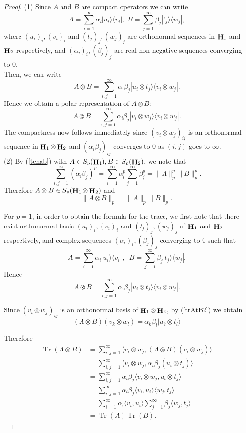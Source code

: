 \documentclass[a4paper,12pt,reqno]{amsart}
\renewcommand\eqref[1]{(\ref{#1})} %
\theoremstyle{definition}
\theoremstyle{remark}
\numberwithin{equation}{section}
\newcommand{\beq}{\begin{equation}}
\newcommand{\eq}{\end{equation}}
\DeclareMathOperator{\Tr}{Tr}
\DeclareMathOperator{\Hi}{{\bf H}}
\begin{document}
\begin{proof} (1) Since $A$ and $B$ are compact operators we can write
\[A=\sum\limits_{i=1}^{\infty}\alpha_i|u_i\rangle\langle v_i|,\,\, B=\sum\limits_{j=1}^{\infty}\beta_j|t_j\rangle\langle w_j|, \]
where $(u_i)_i, (v_i)_i $ and $(t_j)_j, (w_j)_j $ are orthonormal sequences in $ \Hi_1$ and  $ \Hi_2$ respectively, and $(\alpha_i)_i, (\beta_j)_j$ are real non-negative sequences converging to $0$.\\

Then, we can write 
\beq A\otimes B=\sum\limits_{i,j=1}^{\infty}\alpha_i\beta_j|u_i\otimes t_j\rangle\langle v_i\otimes w_j|.\label{trAtB}\eq
Hence we obtain a polar representation of $A\otimes B$:
\beq A\otimes B=\sum\limits_{i,j=1}^{\infty}\alpha_i\beta_j|v_i\otimes w_j\rangle\langle v_i\otimes w_j|.\label{tenab}\eq
The compactness now follows immediately since $ (v_i\otimes w_j)_{ij}$ is an orthonormal sequence in $ \Hi_1\otimes \Hi_2$ and $(\alpha_i\beta_j)_{ij}$ converges to $0$ as $(i,j)$ goes to $\infty$.\\

(2) By \eqref{tenab} with  $A\in S_p(\Hi_1), B\in S_p(\Hi_2)$, we note that
\[\sum\limits_{i,j=1}^{\infty}(\alpha_i\beta_j)^p=\sum\limits_{i=1}^{\infty}\alpha_i^p\sum\limits_{j=1}^{\infty}\beta_j^p=\|A\|_p^p\|B\|_p^p .\]
Therefore  $A\otimes B\in S_p( \Hi_1\otimes \Hi_2)$ and 
\[\|A\otimes B\|_p=\|A\|_p\|B\|_p.\]

For $p=1$, in order to obtain the formula for the trace, we first note that there exist orthonormal basis  $(u_i)_i, (v_i)_i $ and $(t_j)_j, (w_j)_j $ of $ \Hi_1$ and  $ \Hi_2$ respectively, and complex sequences $(\alpha_i)_i, (\beta_j)_j$ converging to $0$ such that
\[A=\sum\limits_{i=1}^{\infty}\alpha_i|u_i\rangle\langle v_i|\,,\,\,\, B=\sum\limits_{j=1}^{\infty}\beta_j|t_j\rangle\langle w_j|. \]
Hence
\beq A\otimes B=\sum\limits_{i,j=1}^{\infty}\alpha_i\beta_j|u_i\otimes t_j\rangle\langle v_i\otimes w_j|.\label{trAtB2}\eq

  
Since  $ (v_i\otimes w_j)_{ij}$ is an orthonormal basis of $ \Hi_1\otimes \Hi_2$,  by \eqref{trAtB2} we obtain
 \[ (A\otimes B)(v_k\otimes w_l)=\alpha_k\beta_l|u_k\otimes t_l\rangle\]
 
Therefore
 \begin{align*}
 \Tr(A\otimes B)&=\sum\limits_{i,j=1}^{\infty}\langle v_i\otimes w_j, (A\otimes B)(v_i\otimes w_j)\rangle\\ 
 &=\sum\limits_{i,j=1}^{\infty}\langle v_i\otimes w_j, \alpha_i\beta_j(u_i\otimes t_j)\rangle\\
 &=\sum\limits_{i,j=1}^{\infty}\alpha_i\beta_j\langle v_i\otimes w_j, u_i\otimes t_j\rangle\\
  &=\sum\limits_{i,j=1}^{\infty}\alpha_i\beta_j\langle v_i, u_i\rangle\langle w_j,  t_j\rangle\\
  &=\sum\limits_{i=1}^{\infty}\alpha_i\langle v_i, u_i\rangle
  \sum\limits_{j=1}^{\infty}\beta_j\langle w_j,  t_j\rangle\\
 &=\Tr(A)\Tr(B).
\end{align*} 
\end{proof}
\end{document}
